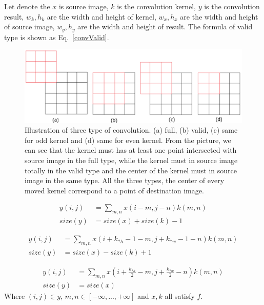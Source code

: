 \documentclass[runningheads,openany]{xhlPaper}
\begin{document}
Let denote the $x$ is source image, $k$ is the convolution kernel, $y$ is the convolution result, $w_k,h_k$ are the width and height of kernel, $w_x, h_x$ are the width and height of source image, $w_y, h_y$ are the width and height of result. The formula of valid type is shown as Eq.~\ref{convValid}.

\begin{figure}
\centering
\includegraphics[width=0.8\linewidth]{convType}
\caption{Illustration of three type of convolution. (a) full, (b) valid, (c) same for odd kernel and (d) same for even kernel. From the picture, we can see that the kernel must has at least one point intersected with source image in the full type, while the kernel must in source image totally in the valid type and the center of the kernel must in source image in the same type. All the three types, the center of every moved kernel correspond to a point of destination image.}
\label{fig:convType}
\end{figure}

\begin{equation}
\label{convFull}
\begin{aligned}
y(i,j) &= \sum\limits_{m,n} {x(i - m,j - n)k(m,n)}\\
size(y) &= size(x) + size(k) - 1
\end{aligned}
\end{equation}

\begin{equation}
\label{convValid}
\begin{aligned}
y(i,j) &= \sum\limits_{m,n} {x(i + k_{*h} - 1 - m,j + k_{*w} - 1 - n)k(m,n)}\\
size(y) &= size(x) - size(k) + 1
\end{aligned}
\end{equation}

\begin{equation}
\label{convSame}
\begin{aligned}
y(i,j) &= \sum\limits_{m,n} {x(i + \frac{k_{*h}}{2} - m,j + \frac{k_{*w}}{2} - n)k(m,n)}\\
size(y) &= size(x)
\end{aligned}
\end{equation}
Where $(i, j) \in y$, $m, n\in [ -\infty,...,+\infty]$ and $x, k$ all satisfy $f$.
\end{document}
